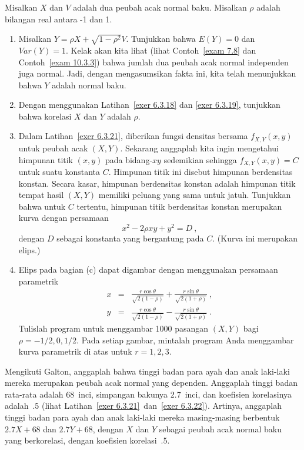 {\begin{LJSItem}
\istar\label{exer 6.3.24} Misalkan $X$ dan $V$ adalah dua peubah acak normal baku.
Misalkan $\rho$ adalah bilangan real antara -1 dan 1.
\begin{enumerate}
\item
Misalkan $Y = \rho X + \sqrt{1 - \rho^2} V$. Tunjukkan bahwa $E(Y) = 0$ dan $Var(Y)
= 1$. Kelak akan kita lihat (lihat Contoh~\ref{exam 7.8} dan
Contoh~\ref{exam 10.3.3}) bahwa jumlah dua peubah acak normal independen juga normal.
Jadi, dengan mengasumsikan fakta ini, kita telah menunjukkan bahwa $Y$ adalah normal
baku.
\item
Dengan menggunakan Latihan~\ref{exer 6.3.18} dan \ref{exer 6.3.19}, tunjukkan bahwa
korelasi $X$ dan $Y$ adalah $\rho$.
\item
Dalam Latihan~\ref{exer 6.3.21}, diberikan fungsi densitas bersama $f_{X,Y}(x, y)$
untuk peubah acak $(X, Y)$. Sekarang anggaplah kita ingin mengetahui himpunan titik
$(x, y)$ pada bidang-$xy$ sedemikian sehingga $f_{X,Y}(x, y) = C$ untuk suatu
konstanta $C$. Himpunan titik ini disebut himpunan berdensitas konstan. Secara kasar,
himpunan berdensitas konstan adalah himpunan titik tempat hasil $(X, Y)$ memiliki
peluang yang sama untuk jatuh. Tunjukkan bahwa untuk $C$ tertentu, himpunan titik
berdensitas konstan merupakan kurva dengan persamaan
$$x^2 - 2\rho x y + y^2 = D\ ,$$
dengan $D$ sebagai konstanta yang bergantung pada $C$. (Kurva ini merupakan elips.)
\item
Elips pada bagian (c) dapat digambar dengan menggunakan persamaan parametrik
\begin{eqnarray*} x & = & \frac {r\cos\theta}{\sqrt{2(1 - \rho)}} + \frac
{r\sin\theta}{\sqrt{2(1 +
\rho)}}\ , \\ y & = & \frac {r\cos\theta}{\sqrt{2(1 - \rho)}} - \frac
{r\sin\theta}{\sqrt{2(1 +
\rho)}}\ .
\end{eqnarray*}
Tulislah program untuk menggambar 1000 pasangan $(X, Y)$ bagi $\rho = -1/2, 0, 1/2$.
Pada setiap gambar, mintalah program Anda menggambar kurva parametrik di atas untuk
$r = 1, 2, 3$.
\end{enumerate}

\istar\label{exer 6.3.25} Mengikuti Galton, anggaplah bahwa tinggi badan para ayah dan
anak laki-laki mereka merupakan peubah acak normal yang dependen. Anggaplah tinggi
badan rata-rata adalah 68~inci, simpangan bakunya 2.7~inci, dan koefisien korelasinya
adalah~.5 (lihat Latihan~\ref{exer 6.3.21}~dan~\ref{exer 6.3.22}). Artinya, anggaplah
tinggi badan para ayah dan anak laki-laki mereka masing-masing berbentuk $2.7X + 68$
dan $2.7Y + 68$, dengan $X$ dan $Y$ sebagai peubah acak normal baku yang berkorelasi,
dengan koefisien korelasi~.5.


\end{LJSItem}}

